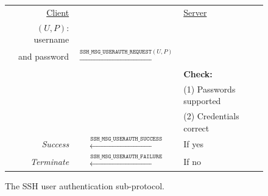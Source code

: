 \begin{figure}[t]
  \centering

  \begin{tabular}{|rcl|}
    \hline
    \underline{Client} & & \underline{Server} \\
    $(U,P)$: username &&\\ and password &
    $\xrightarrow{\mathrm{\texttt{SSH\_MSG\_USERAUTH\_REQUEST}}(U,P)}$
    & \\
    & & \textbf{Check:} \\ && (1) Passwords supported \\ && (2) Credentials
    correct \\
    \textit{Success} & $\xleftarrow{\mathrm{\texttt{SSH\_MSG\_USERAUTH\_SUCCESS}}}$ & If yes \\
    \textit{Terminate} & $\xleftarrow{\mathrm{\texttt{SSH\_MSG\_USERAUTH\_FAILURE}}}$ &
    If no \\
    \hline
  \end{tabular}

  \caption{The SSH user authentication sub-protocol.}
  \label{fig:auth}
  \vspace{-1.5em}
\end{figure}



